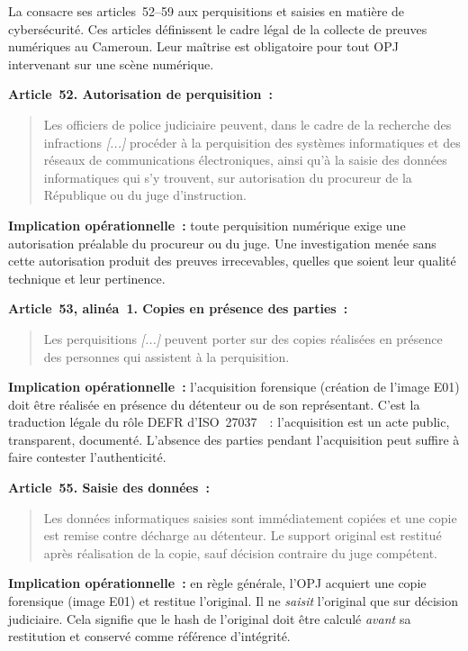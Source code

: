 La  consacre ses articles~52--59 aux perquisitions et saisies
en matière de cybersécurité. Ces articles définissent le cadre légal de la
collecte de preuves numériques au Cameroun. Leur maîtrise est obligatoire
pour tout OPJ intervenant sur une scène numérique.

\begin{boxjuris}
\textbf{Article~52. Autorisation de perquisition~:}
\begin{quote}
Les officiers de police judiciaire peuvent, dans le cadre de la recherche des
infractions \textit{[...]} procéder à la perquisition des systèmes informatiques
et des réseaux de communications électroniques, ainsi qu'à la saisie des données
informatiques qui s'y trouvent, sur autorisation du procureur de la République
ou du juge d'instruction.
\end{quote}
\textbf{Implication opérationnelle~:} toute perquisition numérique exige une
autorisation préalable du procureur ou du juge. Une investigation menée sans
cette autorisation produit des preuves irrecevables, quelles que soient leur
qualité technique et leur pertinence.
\end{boxjuris}

\begin{boxjuris}
\textbf{Article~53, alinéa~1. Copies en présence des parties~:}
\begin{quote}
Les perquisitions \textit{[...]} peuvent porter sur des copies réalisées en
présence des personnes qui assistent à la perquisition.
\end{quote}
\textbf{Implication opérationnelle~:} l'acquisition forensique (création de
l'image E01) doit être réalisée en présence du détenteur ou de son représentant.
C'est la traduction légale du rôle DEFR d'ISO~27037~\cite{iso27037}~: l'acquisition est un
acte public, transparent, documenté. L'absence des parties pendant l'acquisition
peut suffire à faire contester l'authenticité.
\end{boxjuris}

\begin{boxjuris}
\textbf{Article~55. Saisie des données~:}
\begin{quote}
Les données informatiques saisies sont immédiatement copiées et une copie
est remise contre décharge au détenteur. Le support original est restitué
après réalisation de la copie, sauf décision contraire du juge compétent.
\end{quote}
\textbf{Implication opérationnelle~:} en règle générale, l'OPJ acquiert une
copie forensique (image E01) et restitue l'original. Il ne \emph{saisit}
l'original que sur décision judiciaire. Cela signifie que le hash de
l'original doit être calculé \emph{avant} sa restitution et conservé comme
référence d'intégrité.
\end{boxjuris}


